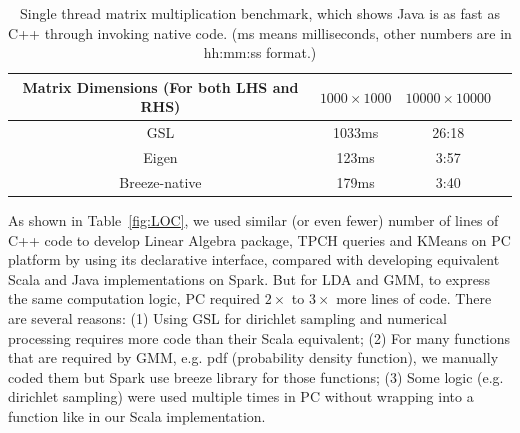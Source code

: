 \begin{table}[h!]
\begin{center}
\begin{tabular}{|c||c|c|c||}
\hline
Matrix Dimensions (For both LHS and RHS) & $1000\times1000$ & $10000\times10000$ \\
\hline
\hline
GSL &1033ms &26:18  \\
Eigen &123ms  &3:57\\
Breeze-native &179ms  &3:40\\
\hline
\end{tabular}
\caption{Single thread matrix multiplication benchmark, which shows
  Java is as fast as C++ through invoking native code. (ms means
  milliseconds, other numbers are in hh:mm:ss format.)}
\label{fig:matrixMult}
\end{center}
\end{table}

\vspace{5pt}
As shown in Table~\ref{fig:LOC}, we used similar (or even fewer) number of lines of C++
code to develop Linear Algebra package, TPCH queries and KMeans on PC
platform by using
its declarative interface, compared with developing equivalent Scala
and Java implementations on Spark. But for LDA and GMM, to express the
same computation logic, PC required $2\times$ to $3\times$ more
lines of code. There are several reasons: (1) Using GSL for dirichlet
sampling and numerical processing requires more code than their Scala
equivalent; (2) For many functions that are required by GMM, e.g. pdf (probability
density function),  we manually coded them but Spark use breeze
library for those functions; (3) Some logic (e.g. dirichlet sampling) were used
multiple times in PC without wrapping into a function like in our
Scala implementation.




